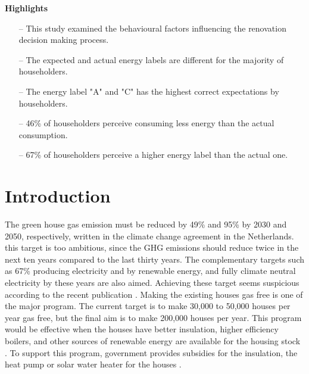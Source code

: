 \documentclass[preprint,12pt,3p]{elsarticle}
\begin{document}
\noindent
\textbf{Highlights}
\begin{itemize}
    \footnotesize
    \item [--] This study examined the behavioural factors influencing the renovation decision making process.
    \item[--] The expected and actual energy labels are different for the majority of householders. 
    \item[--] The energy label "A" and "C" has the highest correct expectations by householders.
    \item[--] 46\% of householders perceive consuming less energy than the actual consumption.
     \item[--] 67\% of householders perceive a higher energy label than the actual one. 
     
\end{itemize}

\section{Introduction}
\label{sec1}

The green house gas emission must be reduced by 49\% and 95\% by 2030 and 2050, respectively, written in the climate change agreement in the Netherlands. this target is too ambitious, since the GHG emissions should reduce twice in the next ten years compared to the last thirty years. The complementary targets such as 67\%  producing electricity and by renewable energy, and fully climate neutral electricity by these years are also aimed. Achieving these target seems suspicious according to the recent publication \citep{evert2019, Pbl2019}. Making the existing houses gas free is one of the major program. The current target is to make 30,000 to 50,000 houses per year gas free, but the final aim is to make 200,000 houses per year. This program would be effective when the houses have better insulation, higher efficiency boilers, and other sources of renewable energy are available for the housing stock \citep{rijk2019}. To support this program, government provides subsidies for the insulation, the heat pump or solar water heater for the houses \citep{rvo2019a, rvo2019b}. 
\end{document}
